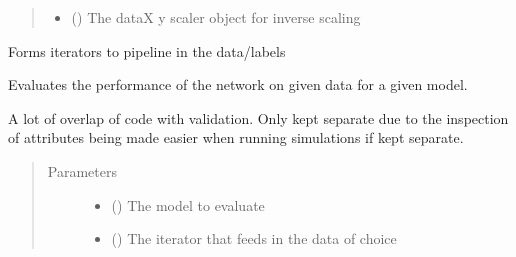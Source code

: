 \documentclass[letterpaper,10pt,english]{sphinxmanual}
\begin{document}
\begin{fulllineitems}
\begin{quote}
\begin{description}
\begin{itemize}
\item {} 
 () \textendash{} The dataX y scaler object for inverse scaling

\end{itemize}

\end{description}\end{quote}

\begin{fulllineitems}
\label{\detokenize{index:Forecaster.deeplearning.DeepLearning.create_data_loaders}}
Forms iterators to pipeline in the data/labels

\end{fulllineitems}


\begin{fulllineitems}
\label{\detokenize{index:Forecaster.deeplearning.DeepLearning.evaluate}}
Evaluates the performance of the network on given data for a given
model.

A lot of overlap of code with validation. Only kept separate due to the
inspection of attributes being made easier when running simulations
if kept separate.
\begin{quote}\begin{description}
\item[{Parameters}] \leavevmode\begin{itemize}
\item {} 
 () \textendash{} The model to evaluate

\item {} 
 () \textendash{} The iterator that feeds in the data of choice


\end{itemize}
\end{description}
\end{quote}
\end{fulllineitems}
\end{fulllineitems}
\end{document}
